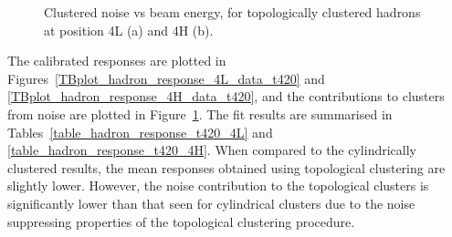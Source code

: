 \begin{figure}[htb]
\begin{center}
\end{center}
\caption[Noise contribution to topoclusters (hadrons)]{Clustered noise vs beam energy, for topologically clustered hadrons at position 4L (a) and 4H (b).}
\label{t420_hadron_noisevbeam}
\end{figure}




The calibrated responses are plotted in Figures~\ref{TBplot_hadron_response_4L_data_t420} and \ref{TBplot_hadron_response_4H_data_t420}, and the contributions to clusters from noise are plotted in Figure~\ref{t420_hadron_noisevbeam}. The fit results are summarised in Tables~\ref{table_hadron_response_t420_4L} and \ref{table_hadron_response_t420_4H}. When compared to the cylindrically clustered results, the mean responses obtained using topological clustering are slightly lower. However, the noise contribution to the topological clusters is significantly lower than that seen for cylindrical clusters due to the noise suppressing properties of the topological clustering procedure.


